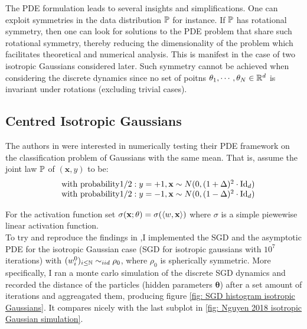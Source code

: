 \documentclass{article}
\begin{document}
The PDE formulation leads to several insights and simplifications. One can exploit symmetries in the data distribution $ \mathbb{P}$ for instance. If $ \mathbb{P}$ has rotational symmetry, then one can look for solutions to the PDE problem that share such rotational symmetry, thereby reducing the dimensionality of the problem which facilitates theoretical and numerical analysis. This is manifest in the case of two isotropic Gaussians considered later. Such symmetry cannot be achieved when considering the discrete dynamics since no set of poitns $ \mathbf{\theta}_{1}, \cdots, \mathbf{\theta}_{N}\in \mathbb{R}^{d}$ is invariant under rotations (excluding trivial cases).


\subsection{Centred Isotropic Gaussians}

The authors in \cite{Mei_2018} were interested in numerically testing their PDE framework on the classification problem of Gaussians with the same mean. That is, assume the joint law $ \mathbb{P}$ of $(\mathbf{x}, y) $ to be:
\begin{equation}
\begin{array}{cc}
& \text{with probability}  1/2: y = +1, \mathbf{x}\sim N(0, (1+\Delta)^{2}\cdot\operatorname{Id}_{d})\\
& \text{with probability} 1/2: y = -1, \mathbf{x}\sim N(0, (1-\Delta)^{2}\cdot\operatorname{Id}_{d})
\end{array}
\end{equation}

For the activation function set $ \sigma( \mathbf{x}; \mathbf{\theta}) = \sigma(\langle w,  \mathbf{x}\rangle)$ where $ \sigma$ is a simple piewewise linear activation function.\\

To try and reproduce the findings in \cite{Mei_2018},I implemented the SGD and the asymptotic PDE for the isotropic Gaussian case (SGD for isotropic gaussians with $10^7$ iterations) with $(w_i^0 )_{i\leq\mathbb{N}} \sim_{iid} \rho_0$, where $\rho_0$ is spherically symmetric. More specifically, I ran a monte carlo simulation of the discrete SGD dynamics and recorded the distance of the particles (hidden parameters $ \mathbf{\theta}$) after a set amount of iterations and aggreagated them, producing figure \ref{fig: SGD histogram isotropic Gaussians}. It compares nicely with the last subplot in \ref{fig: Nguyen 2018 isotropic Gaussian simulation}. 
\end{document}
